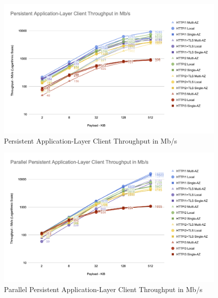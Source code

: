 \begin{figure}[h!]
    \centering
    \includegraphics[width=\linewidth]{figures/charts/Persistent Application-Layer Client Throughput in Mb_s.png}
    \caption{Persistent Application-Layer Client Throughput in Mb/s}
    \label{fig:sequential_app_throughput}
\end{figure}
\begin{figure}[h!]
    \centering
    \includegraphics[width=\linewidth]{figures/charts/Parallel Persistent Application-Layer Client Throughput in Mb_s.png}
    \caption{Parallel Persistent Application-Layer Client Throughput in Mb/s}
    \label{fig:parallel_app_throughput}
\end{figure}

